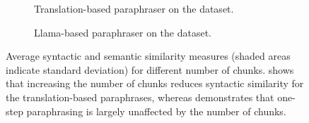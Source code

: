 \begin{figure}[htbp]
  \centering
  \begin{subfigure}[b]{\textwidth}
    \centering
    
    \caption[Translation-based paraphraser on \dataBlog{}]{
    Translation-based paraphraser on the \dataBlog{} dataset.    
    }
    \label{fig:abl_chunks_blog_translation}
  \end{subfigure}
  \hfill
  \begin{subfigure}[b]{\textwidth}
    \centering
    
    \caption[Llama-based paraphraser on \dataStudent{}]{Llama-based paraphraser on the \dataStudent{} dataset.
    }
    \label{fig:abl_chunks_student_essays_llama}
  \end{subfigure}
  \caption[Effect of chunking on syntactic and semantic measures]{Average syntactic and semantic similarity measures (shaded areas indicate standard deviation) for different number of chunks.
   shows that increasing the number of chunks reduces syntactic similarity for the translation-based paraphrases, whereas  demonstrates that one-step paraphrasing is largely unaffected by the number of chunks.
  }
  \label{fig:abl_chunks}
\end{figure}